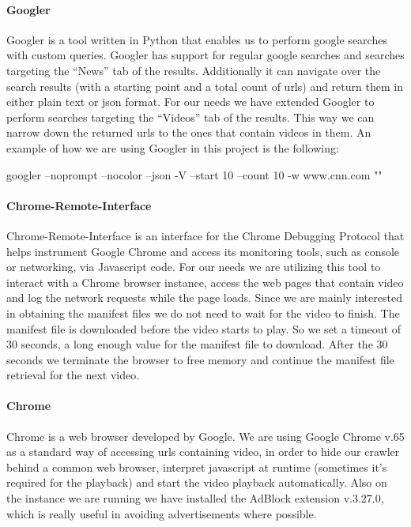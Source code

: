 \documentclass[]{sig-alternate-10pt}
\begin{document}
\hypertarget{googler}{%
\paragraph{Googler}\label{googler}}

Googler \autocite{Googler} is a tool written in Python that enables us
to perform google searches with custom queries. Googler has support for
regular google searches and searches targeting the ``News'' tab of the
results. Additionally it can navigate over the search results (with a
starting point and a total count of urls) and return them in either
plain text or json format. For our needs we have extended Googler to
perform searches targeting the ``Videos'' tab of the results. This way
we can narrow down the returned urls to the ones that contain videos in
them. An example of how we are using Googler in this project is the
following:

\begin{center}
\scriptsize
googler --noprompt --nocolor --json -V --start 10 --count 10 -w www.cnn.com ""
\end{center}

\hypertarget{chrome-remote-interface}{%
\paragraph{Chrome-Remote-Interface}\label{chrome-remote-interface}}

Chrome-Remote-Interface \autocite{ChromeRemoteInterface} is an interface
for the Chrome Debugging Protocol that helps instrument Google Chrome
and access its monitoring tools, such as console or networking, via
Javascript code. For our needs we are utilizing this tool to interact
with a Chrome browser instance, access the web pages that contain video
and log the network requests while the page loads. Since we are mainly
interested in obtaining the manifest files we do not need to wait for
the video to finish. The manifest file is downloaded before the video
starts to play. So we set a timeout of 30 seconds, a long enough value
for the manifest file to download. After the 30 seconds we terminate the
browser to free memory and continue the manifest file retrieval for the
next video.

\hypertarget{chrome}{%
\paragraph{Chrome}\label{chrome}}

Chrome is a web browser developed by Google. We are using Google Chrome
v.65 as a standard way of accessing urls containing video, in order to
hide our crawler behind a common web browser, interpret javascript at
runtime (sometimes it's required for the playback) and start the video
playback automatically. Also on the instance we are running we have
installed the AdBlock extension v.3.27.0, which is really useful in
avoiding advertisements where possible.
\end{document}
